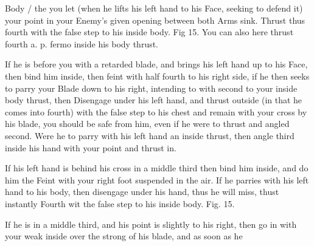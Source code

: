 \newpage


\newpage


Body / the you let (when he lifts his left hand to his Face, seeking
to defend it) your point in your Enemy's given opening between both
Arms sink. Thrust thus fourth with the false step to his inside
body. Fig 15. You can also here thrust fourth a. p. fermo inside his
body thrust.

\exercise{}
If he is before you with a retarded blade, and brings his left hand up
to his Face, then bind him inside, then feint with half fourth to his
right side, if he then seeks to parry your Blade down to his right,
intending to with second to your inside body thrust, then Disengage
under his left hand, and thrust outside (in that he comes into fourth)
with the false step to his chest and remain with your cross by his
blade, you should be safe from him, even if he were to thrust and
angled second. Were he to parry with his left hand an inside thrust,
then angle third inside his hand with your point and thrust in.


\exercise{}
If his left hand is behind his cross in a middle third then bind him
inside, and do him the Feint with your right foot suspended in the
air. If he parries with his left hand to his body, then disengage
under his hand, thus he will miss, thust instantly Fourth wit the
false step to his inside body. Fig. 15.

\exercise{}
If he is in a middle third, and his point is slightly to his right,
then go in with your weak inside over the strong of his blade, and as
soon as he
